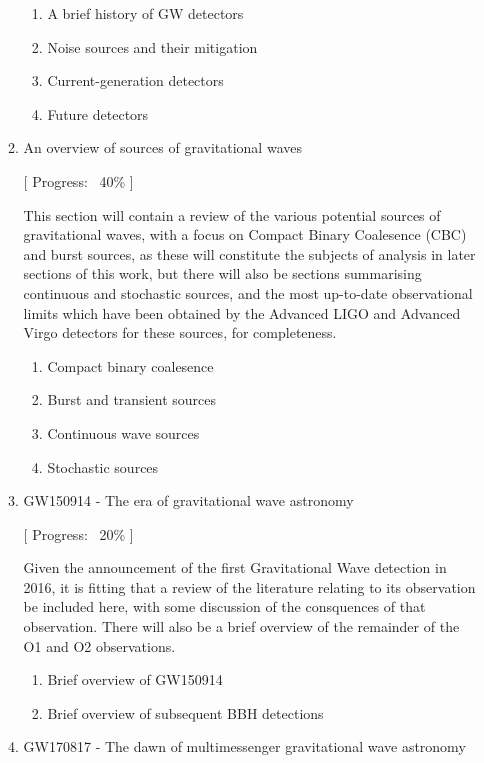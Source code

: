 \documentclass{kentigern}
\theoremstyle{definition}
\begin{document}
\begin{enumerate}
\begin{enumerate}
   \begin{enumerate}
   \item A brief history of GW detectors
   \item Noise sources and their mitigation
   \item Current-generation detectors
   \item Future detectors
   \end{enumerate}

   
\item An overview of sources of gravitational waves

  [ Progress: ~40\% ]
  
   This section will contain a review of the various potential sources
   of gravitational waves, with a focus on Compact Binary Coalesence
   (CBC) and burst sources, as these will constitute the subjects of
   analysis in later sections of this work, but there will also be
   sections summarising continuous and stochastic sources, and the
   most up-to-date observational limits which have been obtained by
   the Advanced LIGO and Advanced Virgo detectors for these sources,
   for completeness.
   \begin{enumerate}
   \item Compact binary coalesence
   \item Burst and transient sources
   \item Continuous wave sources
   \item Stochastic sources
   \end{enumerate}

   
 \item GW150914 - The era of gravitational wave astronomy
   
  [ Progress: ~20\% ]
  
   Given the announcement of the first Gravitational Wave detection in
   2016, it is fitting that a review of the literature relating to its
   observation be included here, with some discussion of the
   consquences of that observation. There will also be a brief
   overview of the remainder of the O1 and O2 observations.
   \begin{enumerate}
   \item Brief overview of GW150914
   \item Brief overview of subsequent BBH detections
   \end{enumerate}

   
 \item GW170817 - The dawn of multimessenger gravitational wave astronomy
  

\end{enumerate}
\end{enumerate}
\end{document}
